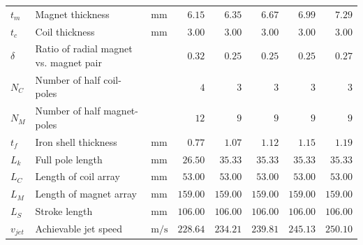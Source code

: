 \begin{landscape}
\begin{table}
\begin{tabular}{lllrrrrr}
                        $t_m$      & Magnet thickness                       & $\mathrm{mm}$  & $6.15$                & $6.35$            & $6.67$            & $6.99$            & $7.29$            \\
                        $t_c$      & Coil thickness                         & $\mathrm{mm}$  & $3.00$                & $3.00$            & $3.00$            & $3.00$            & $3.00$            \\
                        $\delta$   & Ratio of radial magnet vs. magnet pair &                & $0.32$                & $0.25$            & $0.25$            & $0.25$            & $0.27$            \\
                        $N_C$      & Number of half coil-poles              &                & $4$                   & $3$               & $3$               & $3$               & $3$               \\
                        $N_M$      & Number of half magnet-poles            &                & $12$                  & $9$               & $9$               & $9$               & $9$               \\
                        \hline
                        $t_f$      & Iron shell thickness                   & $\mathrm{mm}$  & $0.77$                        & $1.07$            & $1.12$            & $1.15$            & $1.19$    \\       
                        $L_k$      & Full pole length                       & $\mathrm{mm}$  & $26.50$               & $35.33$           & $35.33$           & $35.33$           & $35.33$           \\
                        $L_C$      & Length of coil array                   & $\mathrm{mm}$  & $53.00$               & $53.00$           & $53.00$           & $53.00$           & $53.00$           \\
                        $L_M$      & Length of magnet array                 & $\mathrm{mm}$  & $159.00$              & $159.00$          & $159.00$          & $159.00$          & $159.00$          \\
                        $L_S$      & Stroke length                          & $\mathrm{mm}$  & $106.00$              & $106.00$          & $106.00$          & $106.00$          & $106.00$          \\
                        \hline
                        $v_{jet}$  & Achievable jet speed                   & $\mathrm{m/s}$ & $228.64$              & $234.21$          & $239.81$          & $245.13$          & $250.10$         \\

\end{tabular}
\end{table}
\end{landscape}
